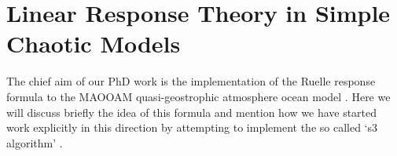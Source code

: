 \section{Linear Response Theory in Simple Chaotic Models} \label{section: LRT}

The chief aim of our PhD work is the implementation of the Ruelle response formula \cite{Ruelle2009} to the MAOOAM quasi-geostrophic atmosphere ocean model \cite{DeCruz2016}. Here we will discuss briefly the idea of this formula and mention how we have started work explicitly in this direction by attempting to implement the so called `s3 algorithm' \cite{Chandramoorthy2020}.
